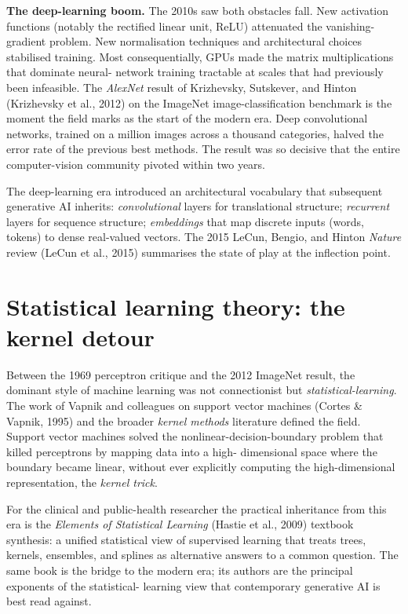 \documentclass[
  letterpaper,
  11pt]{scrbook}
\begin{document}
\textbf{The deep-learning boom.} The 2010s saw both obstacles fall. New
activation functions (notably the rectified linear unit, ReLU)
attenuated the vanishing-gradient problem. New normalisation techniques
and architectural choices stabilised training. Most consequentially,
GPUs made the matrix multiplications that dominate neural- network
training tractable at scales that had previously been infeasible. The
\emph{AlexNet} result of Krizhevsky, Sutskever, and Hinton (Krizhevsky
et al., 2012) on the ImageNet image-classification benchmark is the
moment the field marks as the start of the modern era. Deep
convolutional networks, trained on a million images across a thousand
categories, halved the error rate of the previous best methods. The
result was so decisive that the entire computer-vision community pivoted
within two years.

The deep-learning era introduced an architectural vocabulary that
subsequent generative AI inherits: \emph{convolutional} layers for
translational structure; \emph{recurrent} layers for sequence structure;
\emph{embeddings} that map discrete inputs (words, tokens) to dense
real-valued vectors. The 2015 LeCun, Bengio, and Hinton \emph{Nature}
review (LeCun et al., 2015) summarises the state of play at the
inflection point.

\section{Statistical learning theory: the kernel
detour}\label{statistical-learning-theory-the-kernel-detour}

Between the 1969 perceptron critique and the 2012 ImageNet result, the
dominant style of machine learning was not connectionist but
\emph{statistical-learning}. The work of Vapnik and colleagues on
support vector machines (Cortes \& Vapnik, 1995) and the broader
\emph{kernel methods} literature defined the field. Support vector
machines solved the nonlinear-decision-boundary problem that killed
perceptrons by mapping data into a high- dimensional space where the
boundary became linear, without ever explicitly computing the
high-dimensional representation, the \emph{kernel trick}.

For the clinical and public-health researcher the practical inheritance
from this era is the \emph{Elements of Statistical Learning} (Hastie et
al., 2009) textbook synthesis: a unified statistical view of supervised
learning that treats trees, kernels, ensembles, and splines as
alternative answers to a common question. The same book is the bridge to
the modern era; its authors are the principal exponents of the
statistical- learning view that contemporary generative AI is best read
against.
\end{document}
